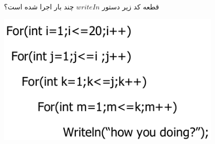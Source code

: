 \EXERCISE
قطعه کد زیر دستور
$writeIn$
چند بار اجرا شده است؟
\begin{center}
\includegraphics[height=6.5cm]{14.png}
\end{center}
